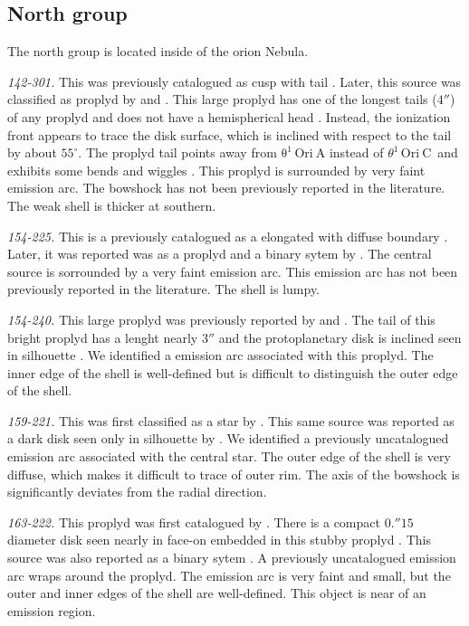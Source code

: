 \documentclass[iop, apj]{emulateapj}
\newcommand\thC{\ensuremath{\theta^1\,\mathrm{Ori~C}}}
\begin{document}
\clearpage
\subsection{North group}
\label{sec:n-group}



The north group is located inside of the orion Nebula.

\textit{142-301.} This was previously catalogued as cusp with tail  \citep{ODell:1996a}. Later, this source was classified as proplyd by \citet{Bally:2000a} and \citet{Ricci:2008a}. This large proplyd has one of the longest tails (\(4''\)) of any proplyd and does not have a hemispherical head . Instead, the ionization front appears to trace the disk surface, which is inclined with respect to the tail by about $55^{\circ}$. The proplyd tail points away from \(\mathrm{\theta^1\,Ori~A}\) instead of \thC~and exhibits some bends and wiggles \citep{Bally:2000a}. This proplyd is surrounded by very faint emission arc. The bowshock has not been previously reported in the literature. The weak shell is thicker at southern. 

\textit{154-225.} This is a previously catalogued as a elongated with diffuse boundary \citep{ODell:1996a}. Later, it was reported was as a proplyd and a binary sytem by \citet{Ricci:2008a}. The central source is sorrounded by a very faint emission arc.  This  emission arc has not been previously reported in the literature. The shell is lumpy.

\textit{154-240.} This large proplyd was previously reported by \citet{Bally:2000a} and \citet{Ricci:2008a}. The tail of this bright proplyd has a lenght nearly \(3''\) and the protoplanetary disk is inclined seen in silhouette \citep{Bally:2000a}. We identified a emission arc associated with this proplyd. The inner edge of the shell is well-defined but is difficult to distinguish the outer edge of the shell.  

\textit{159-221.} This was first classified as a star by \citet{ODell:1996a}. This same source was reported as a dark disk seen only in silhouette by \citet{Ricci:2008a}. We identified a previously uncatalogued emission arc associated with the central star. The outer edge of the shell is very diffuse, which  makes it difficult to trace of outer rim. The axis of the bowshock is significantly deviates from the radial direction.

\textit{163-222.} This proplyd was first catalogued by \citet{ODell:1996a}. There is a compact \(0.''15\) diameter disk seen nearly in face-on embedded  in this stubby  proplyd \citep{Bally:2000a, Ricci:2008a}.  This source was also reported as a binary sytem \citep{Ricci:2008a}. A previously uncatalogued emission arc wraps around the proplyd. The emission arc is very faint and small, but the outer and inner edges of the shell are well-defined. This object is near of an emission region. 
\end{document}
